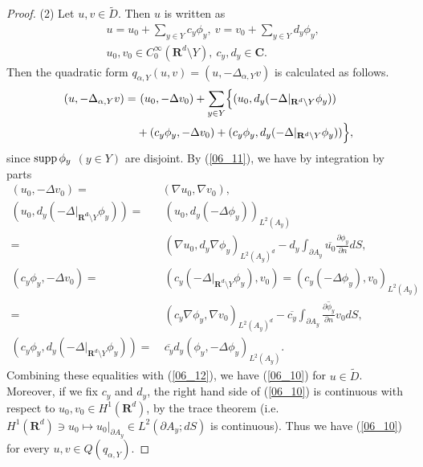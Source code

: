 \documentclass[12pt,a4paper]{article}
\def\supp{\mathop{\rm supp}\nolimits}
\begin{document}
\begin{proof}
(2)
Let $u,v\in \widetilde{D}$. Then $u$ is written as
\begin{align*}
& u=u_0+\sum_{y\in Y} c_y \phi_y,\ 
 v=v_0+\sum_{y\in Y} d_y \phi_y,\\
&
u_0,v_0\in C_0^\infty(\mathbf{R}^d\setminus Y),\ 
c_y,d_y \in \mathbf{C}.
\end{align*}
Then the quadratic form $q_{\alpha,Y}(u,v)=(u,-\Delta_{\alpha,Y}v)$ 
is calculated as follows.
\begin{align}
  (u,-\Delta_{\alpha,Y}v)
=&\ 
(u_0,-\Delta v_0)
+
\sum_{y\in Y}
\Bigl\{
(u_0,d_y(-\Delta|_{\mathbf{R}^d\setminus Y}\phi_y))\notag\\
&+
(c_y\phi_y,-\Delta v_0)
+
(c_y\phi_y,d_y(-\Delta|_{\mathbf{R}^d\setminus Y} \phi_y))
\Bigr\},
\label{06_12}
\end{align}
since $\supp \phi_y$ $(y\in Y)$ are disjoint.
By (\ref{06_11}), we have by integration by parts
\begin{align*}
 (u_0,-\Delta v_0)=&(\nabla u_0,\nabla v_0),\\
(u_0,d_y(-\Delta|_{\mathbf{R^d}\setminus Y} \phi_y))=&\ 
(u_0,d_y(-\Delta \phi_y))_{L^2(A_y)}\\
=&\ (\nabla u_0,d_y\nabla \phi_y)_{L^2(A_y)^d}
-d_y\int_{\partial A_y}\overline{u_0}
\frac{\partial \phi_y}{\partial n}dS,\\
(c_y\phi_y,-\Delta v_0)=&\ 
(c_y(-\Delta|_{\mathbf{R}^d\setminus Y}\phi_y), v_0)
=
(c_y(-\Delta \phi_y), v_0)_{L^2(A_y)}\\
=&\ 
(c_y \nabla \phi_y,\nabla v_0)_{L^2(A_y)^d}
-\overline{c_y}\int_{\partial A_y}
\overline{\frac{\partial \phi_y}{\partial n}}v_0
dS,\\
(c_y\phi_y,d_y(-\Delta|_{\mathbf{R}^d\setminus Y} \phi_y))
=&\ 
\overline{c_y}d_y
(\phi_y,-\Delta \phi_y)_{L^2(A_y)}.
\end{align*}
Combining these equalities with
(\ref{06_12}), we have (\ref{06_10})
for $u\in \widetilde{D}$.
Moreover, 
if we fix $c_y$ and $d_y$,
the right hand side of (\ref{06_10}) is continuous
with respect to $u_0,v_0\in H^1(\mathbf{R}^d)$,
by the trace theorem \cite{Wl}
(i.e.\ $H^1(\mathbf{R}^d)\ni u_0 \mapsto u_0|_{\partial A_y}\in L^2(\partial A_y;dS)$ is continuous).
Thus we have (\ref{06_10}) for every 
$u,v\in Q(q_{\alpha,Y})$.
\end{proof}
\end{document}
